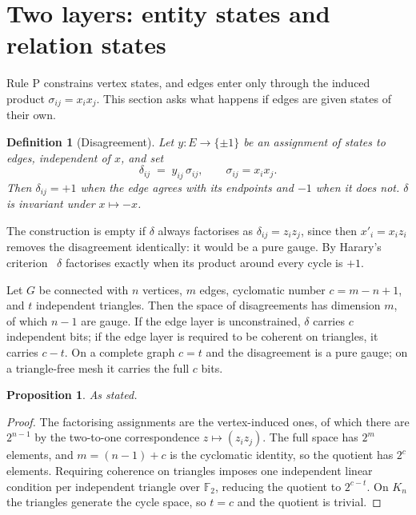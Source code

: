 \documentclass[11pt,a4paper]{article}
\newtheorem{proposition}[theorem]{Proposition}
\newtheorem{definition}[theorem]{Definition}
\newcommand{\Kn}{K_n}
\begin{document}
\section{Two layers: entity states and relation states}
\label{sec:twolayer}

Rule P constrains vertex states, and edges enter only through the induced product $\sigma_{ij}=x_ix_j$. This section asks what happens if edges are given states of their own.

\begin{definition}[Disagreement]
\label{def:delta}
Let $y:E\to\{\pm1\}$ be an assignment of states to edges, independent of $x$, and set
\[
\delta_{ij}\;=\;y_{ij}\,\sigma_{ij},\qquad \sigma_{ij}=x_ix_j .
\]
Then $\delta_{ij}=+1$ when the edge agrees with its endpoints and $-1$ when it does not. $\delta$ is invariant under $x\mapsto-x$.
\end{definition}

The construction is empty if $\delta$ always factorises as $\delta_{ij}=z_iz_j$, since then $x'_i=x_iz_i$ removes the disagreement identically: it would be a pure gauge. By Harary's criterion~\citep{Harary1953} $\delta$ factorises exactly when its product around every cycle is $+1$.

\begin{theorembox}
Let $G$ be connected with $n$ vertices, $m$ edges, cyclomatic number $c=m-n+1$, and $t$ independent triangles. Then the space of disagreements has dimension $m$, of which $n-1$ are gauge. If the edge layer is unconstrained, $\delta$ carries $c$ independent bits; if the edge layer is required to be coherent on triangles, it carries $c-t$. On a complete graph $c=t$ and the disagreement is a pure gauge; on a triangle-free mesh it carries the full $c$ bits.
\end{theorembox}

\begin{proposition}
\label{prop:layers}
As stated.
\end{proposition}

\begin{proof}
The factorising assignments are the vertex-induced ones, of which there are $2^{n-1}$ by the two-to-one correspondence $z\mapsto(z_iz_j)$. The full space has $2^m$ elements, and $m=(n-1)+c$ is the cyclomatic identity, so the quotient has $2^c$ elements. Requiring coherence on triangles imposes one independent linear condition per independent triangle over $\mathbb{F}_2$, reducing the quotient to $2^{c-t}$. On $\Kn$ the triangles generate the cycle space, so $t=c$ and the quotient is trivial.
\end{proof}
\end{document}
